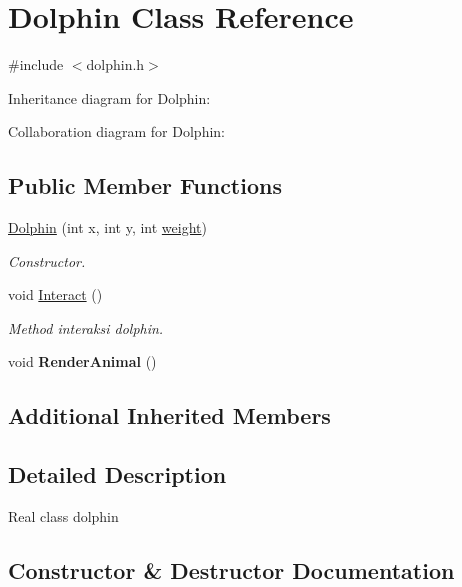 \hypertarget{classDolphin}{}\section{Dolphin Class Reference}
\label{classDolphin}


{\ttfamily \#include $<$dolphin.\+h$>$}



Inheritance diagram for Dolphin\+:


Collaboration diagram for Dolphin\+:
\subsection*{Public Member Functions}
\begin{DoxyCompactItemize}
\item 
\hyperlink{classDolphin_a06bead83fbb996791523ea3f46484972}{Dolphin} (int x, int y, int \hyperlink{classAnimal_a9a3b22f243f7109c57f36b3c660feb6e}{weight})
\begin{DoxyCompactList}\small\item\em Constructor. \end{DoxyCompactList}\item 
void \hyperlink{classDolphin_a718922cd9548a7c6098ad4c253d40e3b}{Interact} ()\hypertarget{classDolphin_a718922cd9548a7c6098ad4c253d40e3b}{}\label{classDolphin_a718922cd9548a7c6098ad4c253d40e3b}

\begin{DoxyCompactList}\small\item\em Method interaksi dolphin. \end{DoxyCompactList}\item 
void {\bfseries Render\+Animal} ()\hypertarget{classDolphin_ad1f56ef82ad09067e903643d3b880776}{}\label{classDolphin_ad1f56ef82ad09067e903643d3b880776}

\end{DoxyCompactItemize}
\subsection*{Additional Inherited Members}


\subsection{Detailed Description}
Real class dolphin 

\subsection{Constructor \& Destructor Documentation}
